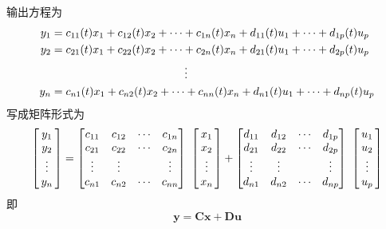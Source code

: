 输出方程为
\begin{equation}
	\begin{aligned}
		y_1 &= c_{11}(t)x_1 + c_{12}(t)x_2 + \cdots + c_{1n}(t)x_n + d_{11}(t)u_1 + \cdots + d_{1p}(t)u_p\\
		y_2 &= c_{21}(t)x_1 + c_{22}(t)x_2 + \cdots + c_{2n}(t)x_n + d_{21}(t)u_1 + \cdots + d_{2p}(t)u_p\\
		& \hspace*{12em}\vdots \\
		y_n &= c_{n1}(t)x_1 + c_{n2}(t)x_2 + \cdots + c_{nn}(t)x_n + d_{n1}(t)u_1 + \cdots + d_{np}(t)u_p
	\end{aligned}
\end{equation}
写成矩阵形式为
\begin{equation}
	\begin{bmatrix}
		y_1\\
		y_2\\
		\hspace*{2mm}\vdots\hspace*{2mm}\\
		y_n
	\end{bmatrix}
	=
	\begin{bmatrix}
		c_{11} & c_{12}  & \cdots & c_{1n}\\
		c_{21} & c_{22}  & \cdots & c_{2n}\\
		\vdots & \vdots &  & \vdots\\
		c_{n1} & c_{n2}  & \cdots & c_{nn}
	\end{bmatrix}
	\,\,
	\begin{bmatrix}
		x_1\\
		x_2\\
		\hspace*{2mm}\vdots\hspace*{2mm}\\
		x_{n}
	\end{bmatrix}
	+
	\begin{bmatrix}
		d_{11} & d_{12}  & \cdots & d_{1p}\\
		d_{21} & d_{22}  & \cdots & d_{2p}\\
		\vdots & \vdots &  & \vdots\\
		d_{n1} & d_{n2}  & \cdots & d_{np}
	\end{bmatrix}
	\,\,
	\begin{bmatrix}
		{u}_1\\
		{u}_2\\
		\hspace*{2mm}\vdots\hspace*{2mm}\\
		{u}_p
	\end{bmatrix}
\end{equation}
即
\begin{equation}
	\bm{y} = \bm{Cx} + \bm{Du}
\end{equation}

